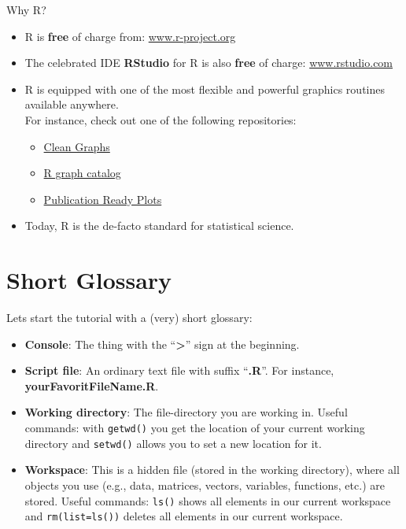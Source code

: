\documentclass[]{book}
\providecommand{\tightlist}{%
  \setlength{\itemsep}{0pt}\setlength{\parskip}{0pt}}
\theoremstyle{definition}
\theoremstyle{definition}
\theoremstyle{definition}
\theoremstyle{remark}
\begin{document}
Why R?

\begin{itemize}
\tightlist
\item
  R is \textbf{free} of charge from: \href{https://www.r-project.org/}{www.r-project.org}
\item
  The celebrated IDE \textbf{RStudio} for R is also \textbf{free} of charge: \href{http://www.rstudio.com/}{www.rstudio.com}
\item
  R is equipped with one of the most flexible and powerful graphics routines available anywhere.\\
  For instance, check out one of the following repositories:

  \begin{itemize}
  \tightlist
  \item
    \href{http://shinyapps.org/apps/RGraphCompendium/index.php}{Clean Graphs}
  \item
    \href{http://shiny.stat.ubc.ca/r-graph-catalog/}{R graph catalog}
  \item
    \href{http://www.sthda.com/english/rpkgs/ggpubr/}{Publication Ready Plots}
  \end{itemize}
\item
  Today, R is the de-facto standard for statistical science.
\end{itemize}

\hypertarget{short-glossary}{%
\section{Short Glossary}\label{short-glossary}}

Lets start the tutorial with a (very) short glossary:

\begin{itemize}
\tightlist
\item
  \textbf{Console}: The thing with the ``\textbf{\textgreater{}}'' sign at the beginning.
\item
  \textbf{Script file}: An ordinary text file with suffix ``\textbf{.R}''. For instance, \textbf{yourFavoritFileName.R}.
\item
  \textbf{Working directory}: The file-directory you are working in. Useful commands: with \texttt{getwd()} you get the location of your current working directory and \texttt{setwd()} allows you to set a new location for it.
\item
  \textbf{Workspace}: This is a hidden file (stored in the working directory), where all objects you use (e.g., data, matrices, vectors, variables, functions, etc.) are stored. Useful commands: \texttt{ls()} shows all elements in our current workspace and \texttt{rm(list=ls())} deletes all elements in our current workspace.
\end{itemize}
\end{document}
